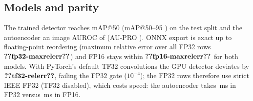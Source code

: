 \documentclass[conference]{IEEEtran}
\begin{document}
\subsection{Models and parity}
The trained detector reaches mAP@50  (mAP@50--95 ) on the test split and the autoencoder
an image AUROC of  (AU-PRO ). ONNX export is exact up to floating-point reordering
(maximum relative error over all FP32 rows $\res{fp32-maxrelerr}$) and FP16 stays within $\res{fp16-maxrelerr}$ for
both models. With PyTorch's default TF32 convolutions the GPU detector deviates by $\res{tf32-relerr}$, failing the
FP32 gate ($10^{-4}$); the FP32 rows therefore
use strict IEEE FP32 (TF32 disabled), which costs speed: the autoencoder takes \,ms in FP32 versus
\,ms in FP16.
\end{document}
